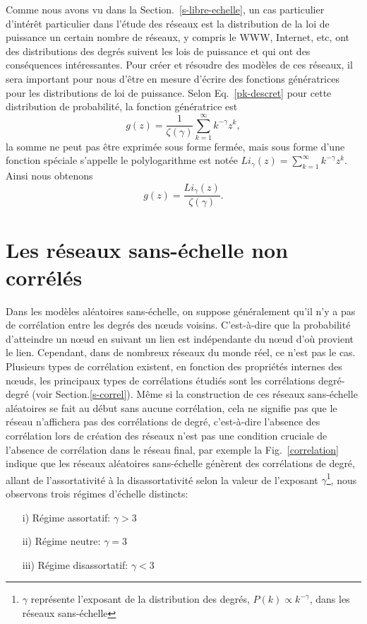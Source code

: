 Comme nous avons vu dans la Section.~\ref{s-libre-echelle}, un cas particulier d'intérêt particulier dans l'étude des réseaux est la distribution de la loi de puissance un certain nombre de réseaux, y compris le WWW, Internet, etc, ont des distributions des degrés suivent les lois de puissance et qui ont des conséquences intéressantes. Pour créer et résoudre des modèles de ces réseaux, il sera important pour nous d'être en mesure d'écrire des fonctions génératrices pour les distributions de loi de puissance.
Selon Eq.~\eqref{pk-descret} pour cette distribution de probabilité, la fonction génératrice est 
\begin{equation}
g(z)=\frac{1}{\zeta(\gamma)}\sum_{k=1}^{\infty}k^{-\gamma}z^{k},
\end{equation}
la somme ne peut pas être exprimée sous forme fermée, mais sous forme d'une fonction spéciale s'appelle le polylogarithme est notée
$Li_{\gamma}(z)=\sum_{k=1}^{\infty}k^{-\gamma}z^k$.\\
Ainsi nous obtenons
\begin{equation}
g(z)=\frac{Li_{\gamma}(z)}{\zeta(\gamma)}.
\end{equation}


\section{Les réseaux sans-échelle non corrélés}
Dans les modèles aléatoires sans-échelle, on suppose généralement qu'il n'y a pas de corrélation entre les degrés des nœuds voisins. C'est-à-dire que la probabilité d'atteindre un nœud en suivant un lien est indépendante du nœud d'où provient le lien. Cependant, dans de nombreux réseaux du monde réel, ce n'est pas le cas. Plusieurs types de corrélation existent, en fonction des propriétés internes des nœuds, les principaux types de corrélations étudiés sont les corrélations degré-degré (voir Section.\ref{s-correl}). Même si la construction de ces réseaux sans-échelle aléatoires se fait au début sans aucune corrélation, cela ne signifie pas que le réseau n'affichera pas des corrélations de degré, c'est-à-dire l'absence des corrélation lors de création des réseaux n'est pas une condition cruciale de l'absence de corrélation dans le réseau final, par exemple la Fig.~\ref{correlation} indique que les réseaux aléatoires sans-échelle génèrent des corrélations de degré, allant de l'assortativité à la disassortativité selon la valeur de l'exposant $\gamma$\footnote{$\gamma$ représente l'exposant de la distribution des degrés, $P(k)\propto k^{-\gamma}$, dans les réseaux sans-échelle }, nous observons trois régimes d'échelle distincts:
\begin{itemize}
	\item[i)] Régime assortatif: $\gamma>3$
	\item[ii)]Régime neutre: $\gamma=3$
	\item[iii)] Régime disassortatif: $\gamma<3$
\end{itemize}

